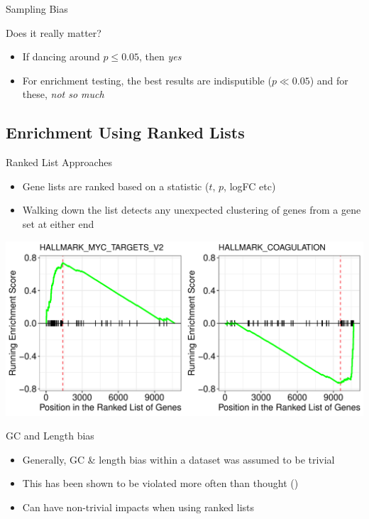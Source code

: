 \documentclass[11pt]{beamer}
\begin{document}
\begin{frame}{Sampling Bias}

Does it really matter?

	\begin{itemize}
		\item If dancing around $p \leq 0.05$, then \textit{yes}
		\item For enrichment testing, the best results are indisputible ($p \ll 0.05$) and for these, \textit{not so much}
	\end{itemize}		

\end{frame}

\subsection{Enrichment Using Ranked Lists}

\begin{frame}{Ranked List Approaches}

	\begin{itemize}
		\item Gene lists are ranked based on a statistic ($t$, $p$, logFC etc)
		\item Walking down the list detects any unexpected clustering of genes from a gene set at either end
	\end{itemize}
	
	\center
	\includegraphics[width=0.7\linewidth]{figures/BarcodePlot.pdf} 

\end{frame}

\begin{frame}{GC and Length bias}

	\begin{itemize}
		\item Generally, GC \& length bias within a dataset was assumed to be trivial
		\item This has been shown to be violated more often than thought (\textit{\cite{MandelboumRNABias}})
		\item Can have non-trivial impacts when using ranked lists
	\end{itemize}

\end{frame}
\end{document}
